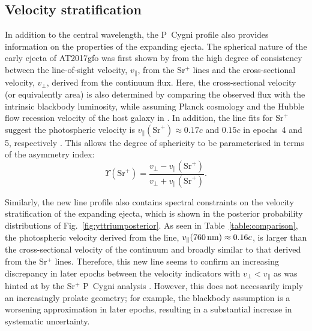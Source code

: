 \documentclass{aa}
\begin{document}
\subsection{Velocity stratification}\label{sec:vel}
In addition to the central wavelength, the P~Cygni profile also provides information on the properties of the expanding ejecta. The spherical nature of the early ejecta of AT2017gfo was first shown by \citet{Sneppen2023} from the high degree of consistency between the line-of-sight velocity, $v_\parallel$, from the Sr\(^+\) lines and the cross-sectional velocity, $v_\perp$, derived from the continuum flux. Here, the cross-sectional velocity (or equivalently area) is also determined by comparing the observed flux with the intrinsic blackbody luminosity, while assuming Planck cosmology \citep{Planck2018} and the Hubble flow recession velocity of the host galaxy in \citet{Mukherjee2021}. In addition, the line fits for $\textrm{Sr}^+$ suggest the photospheric velocity is $v_\parallel(\textrm{Sr}^+) \approx 0.17c$ and $0.15c$ in epochs~4 and 5, respectively \citep{Sneppen2023}. This allows the degree of sphericity to be parameterised in terms of the asymmetry index: 
\begin{equation}
    \Upsilon( \textrm{Sr}^+) = \frac{v_\perp-v_\parallel(\textrm{Sr}^+)}{v_\perp+v_\parallel(\textrm{Sr}^+)}
.\end{equation}

Similarly, the new line profile also contains spectral constraints on the velocity stratification of the expanding ejecta, which is shown in the posterior probability distributions of Fig.~\ref{fig:yttriumposterior}.
As seen in Table~\ref{table:comparison}, the photospheric velocity derived from the line, $v_{\parallel}{\rm(760\,nm)} \approx 0.16c$, is larger than the cross-sectional velocity of the continuum and broadly similar to that derived from the Sr\(^+\) lines. %
Therefore, this new line seems to confirm an increasing discrepancy in later epochs between the velocity indicators with $v_\perp<v_\parallel$ as was hinted at by the Sr\(^+\) P~Cygni analysis \citep{Sneppen2023}. However, this does not necessarily imply an increasingly prolate geometry; for example, the blackbody assumption is a worsening approximation in later epochs, resulting in a substantial increase in systematic uncertainty.  %
\end{document}
